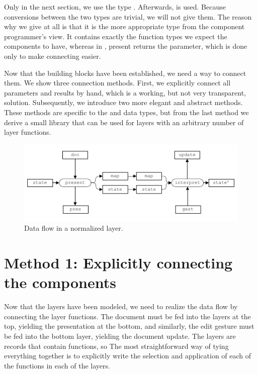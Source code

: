 \documentclass[preprint,natbib]{sigplanconf}
\begin{document}

\bc
Only in the next section, we use the type . Afterwards,  is used. Because conversions between the two types are trivial, we will not give them. The reason why we give  at all is that it is the more appropriate type from the component programmer's view. It contains exactly the function types we expect the components to have, whereas in , present returns the  parameter, which is done only to make connecting easier.
\ec

\bc
Now that the building blocks have been established, we need a way to connect them. We show three connection methods. First, we explicitly connect all parameters and results by hand, which is a working, but not very transparent, solution. Subsequently, we introduce two more elegant and abstract methods. These methods are specific to the  and  data types, but from the last method we derive a small library that can be used for layers with an arbitrary number of layer functions. 
\ec

\begin{figure}
\includegraphics[width=\columnwidth]{images/NormalizedLayer}
\caption{Data flow in a normalized layer.}\label{wrapped} 
\end{figure}


%																
%																
%																
\section{Method 1: Explicitly connecting the components} \label{sect:simple}

Now that the layers have been modeled, we need to realize the data flow by connecting the layer functions. The document must be fed into the layers at the top, yielding the presentation at the bottom, and similarly, the edit gesture must be fed into the bottom layer, yielding the document update. \bc The layers are records that contain functions, so  \ec The most straightforward way of tying everything together is to explicitly write the selection and application of each of the functions in each of the layers. 
\end{document}
